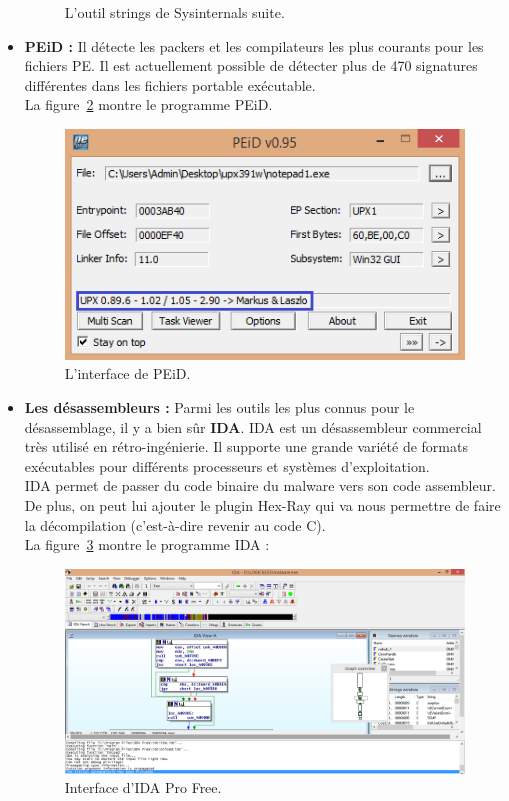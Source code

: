 \begin{itemize}
\begin{figure}[H]
\begin{center}
\caption{L'outil strings de Sysinternals suite.}
\label{fig :strings} 
\end{center}
\end{figure}
\item \textbf{PEiD : }Il détecte les packers et les compilateurs les plus courants pour les fichiers PE. Il est actuellement possible de détecter plus de 470 signatures différentes dans les fichiers portable exécutable.\\
La figure~\ref{fig :pei} montre le programme PEiD.
 \begin{figure}[H]
\begin{center}
\includegraphics[scale=0.8]{Figures/PEID.png}
\caption{L'interface de PEiD.}
\label{fig :pei} 
\end{center}
\end{figure}
\item \textbf{Les désassembleurs : }Parmi les outils les plus connus pour le désassemblage, il y a bien sûr \textbf{IDA}. IDA  est un désassembleur commercial très utilisé en rétro-ingénierie. Il supporte une grande variété de formats exécutables pour différents processeurs et systèmes d'exploitation.\\
IDA permet de passer du code binaire du malware vers son code assembleur. De plus, on peut lui ajouter le plugin Hex-Ray qui va nous permettre de faire la décompilation (c'est-à-dire revenir au code C).\\
La figure~\ref{fig :ida} montre le programme IDA :
\begin{figure}[H]
\begin{center}
\includegraphics[scale=0.42]{Figures/ida.png}
\caption{Interface d'IDA Pro Free.}
\label{fig :ida} 
\end{center}
\end{figure}
\end{itemize}
